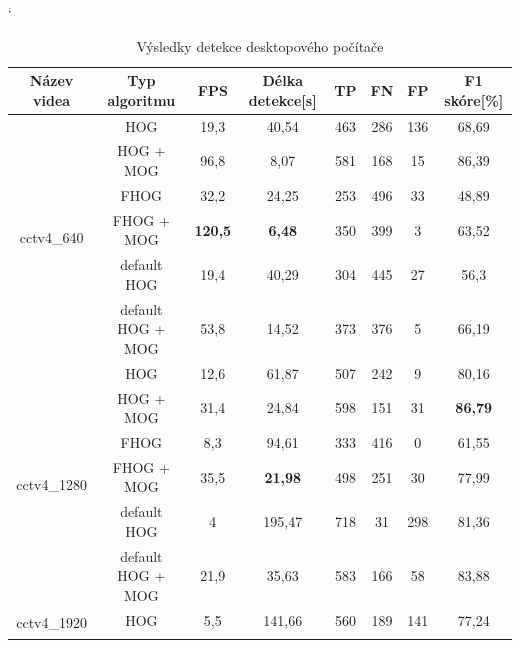 \begin{table}[H]
\catcode`
\centering
\caption{Výsledky detekce desktopového počítače}
\label{resultTabDesktop}
\begin{tabular}{|c|c|c|c|c|c|c|c|}
\hline

{Název videa}                 & Typ algoritmu     & FPS & Délka detekce[s] & TP          & FN      & FP      & F1 skóre[\%] \\  \hline
\multirow{6}{*}{cctv4\_640} & HOG &                    19,3      & 40,54  & 463 &    286 &     136 &     68,69    \\ \cline{2-8}  
                              & HOG + MOG &            96,8      & 8,07  & 581 &     168 &     15 &      86,39    \\ \cline{2-8}  
                              & FHOG &                 32,2      & 24,25  & 253 &    496 &     33 &      48,89    \\ \cline{2-8}  
                              & FHOG + MOG &   \textbf{120,5}      & \textbf{6,48}  & 350 &     399 &     3 &       63,52    \\ \cline{2-8}   
                              &  default HOG &         19,4      & 40,29  & 304 &    445 &     27 &      56,3    \\ \cline{2-8}  
                              &  default HOG + MOG &   53,8      & 14,52  & 373 &    376 &     5 &       66,19    \\ \hline \hline   
\multirow{6}{*}{cctv4\_1280}& HOG &                    12,6      & 61,87  & 507 &    242 &     9 &       80,16    \\ \cline{2-8}  
                              & HOG + MOG &            31,4      & 24,84  & 598 &    151 &     31 &      \textbf{86,79}    \\ \cline{2-8}  
                              & FHOG &                 8,3       & 94,61  & 333 &    416 &     0 &       61,55    \\ \cline{2-8}  
                              & FHOG + MOG &           35,5      & \textbf{21,98}  & 498 &    251 &     30 &      77,99    \\ \cline{2-8}  
                              &  default HOG &         4         & 195,47  & 718 &   31 &      298 &     81,36    \\ \cline{2-8}  
                              &  default HOG + MOG &   21,9      & 35,63  & 583 &    166 &     58 &      83,88    \\ \hline \hline   
\multirow{6}{*}{cctv4\_1920}& HOG  &                   5,5       & 141,66  & 560 &   189 &     141 &     77,24    \\ \cline{2-8}  

\end{tabular}
\end{table}
